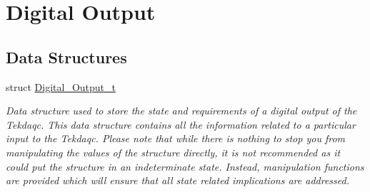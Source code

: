 \hypertarget{group__digital__output}{\section{Digital Output}
\label{group__digital__output}
}
\subsection*{Data Structures}
\begin{DoxyCompactItemize}
\item 
struct \hyperlink{struct_digital___output__t}{Digital\-\_\-\-Output\-\_\-t}
\begin{DoxyCompactList}\small\item\em Data structure used to store the state and requirements of a digital output of the Tekdaqc. This data structure contains all the information related to a particular input to the Tekdaqc. Please note that while there is nothing to stop you from manipulating the values of the structure directly, it is not recommended as it could put the structure in an indeterminate state. Instead, manipulation functions are provided which will ensure that all state related implications are addressed. \end{DoxyCompactList}\end{DoxyCompactItemize}
